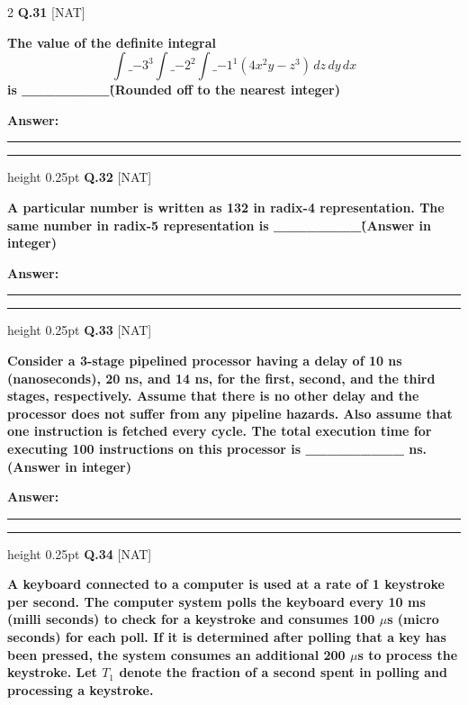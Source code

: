 \documentclass[a4paper,10pt,twoside]{article}
\begin{document}
\begin{multicols}{2}
\noindent\textbf{Q.31} \hfill {\footnotesize\textsf{[NAT]}}
\par\vspace{2pt}
{\bfseries The value of the definite integral
\[ \int\_{-3}^3 \int\_{-2}^2 \int\_{-1}^1 (4x^2 y - z^3) \, dz \, dy \, dx \]
is \_\_\_\_\_\_\_\_\. (Rounded off to the nearest integer) \par}
\par\vspace{3pt}\noindent\textbf{Answer:} \rule{3.2cm}{0.4pt}
\par\vspace{6pt}\hrule height 0.25pt\vspace{6pt}
\noindent\textbf{Q.32} \hfill {\footnotesize\textsf{[NAT]}}
\par\vspace{2pt}
{\bfseries A particular number is written as 132 in radix-4 representation. The same number in radix-5 representation is \_\_\_\_\_\_\_\_\. (Answer in integer) \par}
\par\vspace{3pt}\noindent\textbf{Answer:} \rule{3.2cm}{0.4pt}
\par\vspace{6pt}\hrule height 0.25pt\vspace{6pt}
\noindent\textbf{Q.33} \hfill {\footnotesize\textsf{[NAT]}}
\par\vspace{2pt}
{\bfseries Consider a 3-stage pipelined processor having a delay of 10 ns (nanoseconds), 20 ns, and 14 ns, for the first, second, and the third stages, respectively. Assume that there is no other delay and the processor does not suffer from any pipeline hazards. Also assume that one instruction is fetched every cycle.
The total execution time for executing 100 instructions on this processor is \_\_\_\_\_\_\_\_\_ ns. (Answer in integer) \par}
\par\vspace{3pt}\noindent\textbf{Answer:} \rule{3.2cm}{0.4pt}
\par\vspace{6pt}\hrule height 0.25pt\vspace{6pt}
\noindent\textbf{Q.34} \hfill {\footnotesize\textsf{[NAT]}}
\par\vspace{2pt}
{\bfseries A keyboard connected to a computer is used at a rate of 1 keystroke per second. The computer system polls the keyboard every 10 ms (milli seconds) to check for a keystroke and consumes 100 $\mu$s (micro seconds) for each poll. If it is determined after polling that a key has been pressed, the system consumes an additional 200 $\mu$s to process the keystroke. Let $T_1$ denote the fraction of a second spent in polling and processing a keystroke.
}
\end{multicols}
\end{document}
